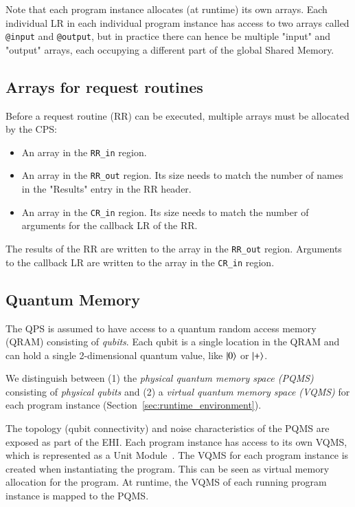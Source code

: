 Note that each program instance allocates (at runtime) its own arrays. Each individual LR in each individual program instance has access to two arrays called \texttt{@input}  and \texttt{@output}, but in practice there can hence be multiple "input" and "output" arrays, each occupying a different part of the global Shared Memory.


\subsection{Arrays for request routines}
Before a request routine (RR) can be executed, multiple arrays must be allocated by the CPS:
\begin{itemize}
\item An array in the \texttt{RR\_in} region. 
\item An array in the \texttt{RR\_out} region. Its size needs to match the number of names in the "Results" entry in the RR header.
\item An array in the \texttt{CR\_in} region. Its size needs to match the number of arguments for the callback LR of the RR.
\end{itemize}

The results of the RR are written to the array in the \mbox{\texttt{RR\_out}} region. Arguments to the callback LR are written to the array in the \texttt{CR\_in} region.



\subsection{Quantum Memory}
\label{sec:app:quantum_memory}
The QPS is assumed to have access to a quantum random access memory (QRAM) consisting of \textit{qubits}.
Each qubit is a single location in the QRAM and can hold a single 2-dimensional quantum value, like $\ket{0}$ or $\ket{+}$.

We distinguish between (1) the \textit{physical quantum memory space (PQMS)} consisting of \textit{physical qubits}
and (2) a \textit{virtual quantum memory space (VQMS)} for each program instance (Section~\ref{sec:runtime_environment}).

The topology (qubit connectivity) and noise characteristics of the PQMS are exposed as part of the EHI.
Each program instance has access to its own VQMS, which is represented as a Unit Module~\cite{dahlberg2022netqasm}.
The VQMS for each program instance is created when instantiating the program.
This can be seen as virtual memory allocation for the program.
At runtime, the VQMS of each running program instance is mapped to the PQMS.

